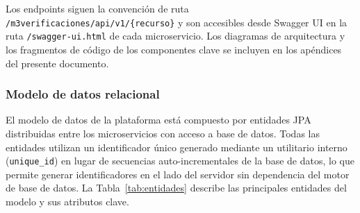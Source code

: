 \documentclass[12pt,a4paper,oneside]{report}
\begin{document}
Los endpoints siguen la convención de ruta \texttt{/m3verificaciones/api/v1/\{recurso\}} y son accesibles desde Swagger UI en la ruta \texttt{/swagger-ui.html} de cada microservicio. Los diagramas de arquitectura y los fragmentos de código de los componentes clave se incluyen en los apéndices del presente documento.

\subsubsection*{Modelo de datos relacional}

El modelo de datos de la plataforma está compuesto por entidades JPA distribuidas entre los microservicios con acceso a base de datos. Todas las entidades utilizan un identificador único generado mediante un utilitario interno (\texttt{unique\_id}) en lugar de secuencias auto-incrementales de la base de datos, lo que permite generar identificadores en el lado del servidor sin dependencia del motor de base de datos. La Tabla~\ref{tab:entidades} describe las principales entidades del modelo y sus atributos clave.
\end{document}
